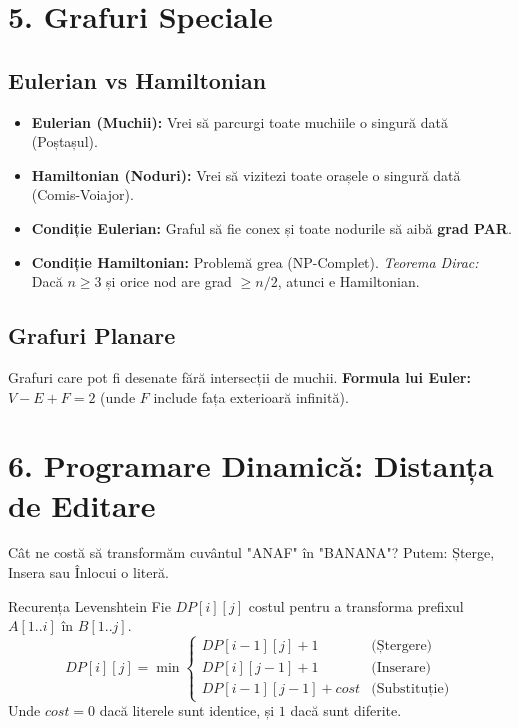 \documentclass[a4paper,10pt]{article}
\begin{document}
\section{5. Grafuri Speciale}

\subsection{Eulerian vs Hamiltonian}
\begin{tcolorbox}[colback=white, title=Diferența Esențială]
\begin{itemize}
    \item \textbf{Eulerian (Muchii):} Vrei să parcurgi toate muchiile o singură dată (Poștașul).
    \item \textbf{Hamiltonian (Noduri):} Vrei să vizitezi toate orașele o singură dată (Comis-Voiajor).
\end{itemize}
\end{tcolorbox}

\begin{itemize}
    \item \textbf{Condiție Eulerian:} Graful să fie conex și toate nodurile să aibă \textbf{grad PAR}.
    \item \textbf{Condiție Hamiltonian:} Problemă grea (NP-Complet). \textit{Teorema Dirac:} Dacă $n \ge 3$ și orice nod are grad $\ge n/2$, atunci e Hamiltonian.
\end{itemize}

\subsection{Grafuri Planare}
Grafuri care pot fi desenate fără intersecții de muchii.
\textbf{Formula lui Euler:} $V - E + F = 2$ (unde $F$ include fața exterioară infinită).

\section{6. Programare Dinamică: Distanța de Editare}

\begin{intuition}
Cât ne costă să transformăm cuvântul "ANAF" în "BANANA"?
Putem: Șterge, Insera sau Înlocui o literă.
\end{intuition}

\begin{algorithmbox}{Recurența Levenshtein}
Fie $DP[i][j]$ costul pentru a transforma prefixul $A[1..i]$ în $B[1..j]$.
$$ DP[i][j] = \min \begin{cases} 
DP[i-1][j] + 1 & \text{(Ștergere)} \\
DP[i][j-1] + 1 & \text{(Inserare)} \\
DP[i-1][j-1] + cost & \text{(Substituție)}
\end{cases} $$
Unde $cost=0$ dacă literele sunt identice, și $1$ dacă sunt diferite.
\end{algorithmbox}
\end{document}
